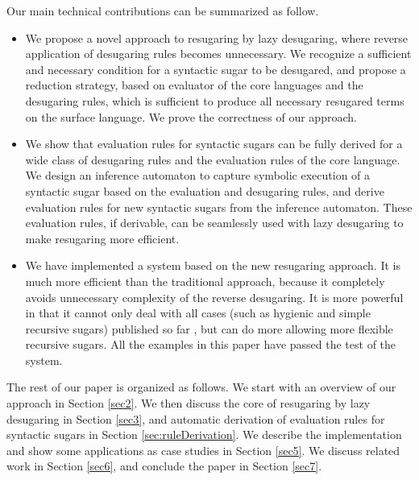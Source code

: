 Our main technical contributions can be summarized as follow.
\begin{itemize}
\item We propose a novel approach to resugaring by lazy desugaring, where reverse application of desugaring rules becomes unnecessary. We recognize a sufficient and necessary condition for a syntactic sugar to be desugared, and propose a reduction strategy, based on evaluator of the core languages and the desugaring rules, which is sufficient to produce all necessary resugared terms on the surface language. We prove the correctness of our approach.



\item We show that evaluation rules for syntactic sugars can be fully derived for a wide  class of desugaring rules and the evaluation rules of the core language. We design an inference automaton to capture symbolic execution of a syntactic sugar based on the evaluation and desugaring rules, and derive evaluation rules for new syntactic sugars from the inference automaton. These evaluation rules, if derivable, can be seamlessly used with lazy desugaring to make resugaring more efficient.



\item We have implemented a system based on the new resugaring approach. It is much more efficient than the traditional approach, because it completely avoids unnecessary complexity of the reverse desugaring. It is more powerful in that it cannot only deal with all cases (such as hygienic and simple recursive sugars) published so far \cite{resugaring,hygienic}, but can do more allowing more flexible recursive sugars. All the examples in this paper have passed the test of the system.


\end{itemize}

The rest of our paper is organized as follows. We start with an overview of our approach in Section \ref{sec2}. We then discuss the core of resugaring by lazy desugaring in Section \ref{sec3}, and automatic derivation of evaluation rules for syntactic sugars in Section \ref{sec:ruleDerivation}. We describe the implementation and show some applications as case studies in Section \ref{sec5}. We discuss related  work in Section \ref{sec6}, and conclude the paper in Section \ref{sec7}.
